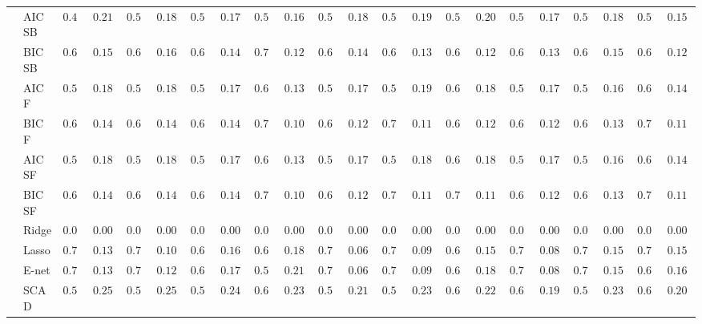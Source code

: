 \begin{tabular}{ll|ll|llllll|llllll|llllll}
 & AIC SB  & $0.498$ & $0.2118$ & $0.524$ & $0.1881$ & $0.546$ & $0.1702$ & $0.598$ & $0.1645$ & $0.538$ & $0.1857$ & $0.558$ & $0.1913$ & $0.548$ & $0.2002$ & $0.570$ & $0.1761$ & $0.538$ & $0.1813$ & $0.582$ & $0.1559$ \\
 & BIC SB  & $0.658$ & $0.1512$ & $0.634$ & $0.1609$ & $0.652$ & $0.1494$ & $0.700$ & $0.1223$ & $0.690$ & $0.1403$ & $0.690$ & $0.1314$ & $0.666$ & $0.1273$ & $0.682$ & $0.1306$ & $0.658$ & $0.1590$ & $0.668$ & $0.1278$ \\
 & AIC F  & $0.532$ & $0.1825$ & $0.554$ & $0.1839$ & $0.574$ & $0.1721$ & $0.648$ & $0.1396$ & $0.564$ & $0.1761$ & $0.584$ & $0.1900$ & $0.606$ & $0.1830$ & $0.596$ & $0.1752$ & $0.584$ & $0.1600$ & $0.660$ & $0.1463$ \\
 & BIC F  & $0.666$ & $0.1423$ & $0.648$ & $0.1480$ & $0.672$ & $0.1464$ & $0.730$ & $0.1040$ & $0.696$ & $0.1286$ & $0.710$ & $0.1185$ & $0.688$ & $0.1217$ & $0.696$ & $0.1222$ & $0.692$ & $0.1346$ & $0.706$ & $0.1188$ \\
 & AIC SF  & $0.532$ & $0.1825$ & $0.554$ & $0.1839$ & $0.574$ & $0.1721$ & $0.648$ & $0.1396$ & $0.566$ & $0.1754$ & $0.588$ & $0.1860$ & $0.620$ & $0.1853$ & $0.598$ & $0.1717$ & $0.584$ & $0.1600$ & $0.662$ & $0.1469$ \\
 & BIC SF  & $0.666$ & $0.1423$ & $0.648$ & $0.1480$ & $0.676$ & $0.1415$ & $0.730$ & $0.1040$ & $0.696$ & $0.1286$ & $0.710$ & $0.1185$ & $0.700$ & $0.1155$ & $0.696$ & $0.1222$ & $0.694$ & $0.1317$ & $0.706$ & $0.1188$ \\
 & Ridge  & $0.000$ & $0.0000$ & $0.000$ & $0.0000$ & $0.000$ & $0.0000$ & $0.000$ & $0.0000$ & $0.000$ & $0.0000$ & $0.000$ & $0.0000$ & $0.000$ & $0.0000$ & $0.000$ & $0.0000$ & $0.000$ & $0.0000$ & $0.000$ & $0.0000$ \\
 & Lasso  & $0.752$ & $0.1396$ & $0.756$ & $0.1085$ & $0.666$ & $0.1683$ & $0.656$ & $0.1800$ & $0.784$ & $0.0615$ & $0.768$ & $0.0931$ & $0.670$ & $0.1567$ & $0.766$ & $0.0807$ & $0.734$ & $0.1506$ & $0.710$ & $0.1541$ \\
 & E-net  & $0.752$ & $0.1396$ & $0.746$ & $0.1201$ & $0.654$ & $0.1749$ & $0.574$ & $0.2121$ & $0.780$ & $0.0667$ & $0.766$ & $0.0987$ & $0.616$ & $0.1813$ & $0.764$ & $0.0871$ & $0.728$ & $0.1544$ & $0.684$ & $0.1686$ \\
 & SCAD  & $0.540$ & $0.2535$ & $0.548$ & $0.2584$ & $0.536$ & $0.2460$ & $0.634$ & $0.2345$ & $0.590$ & $0.2153$ & $0.576$ & $0.2332$ & $0.602$ & $0.2265$ & $0.608$ & $0.1968$ & $0.536$ & $0.2393$ & $0.644$ & $0.2022$ \\

\end{tabular}
